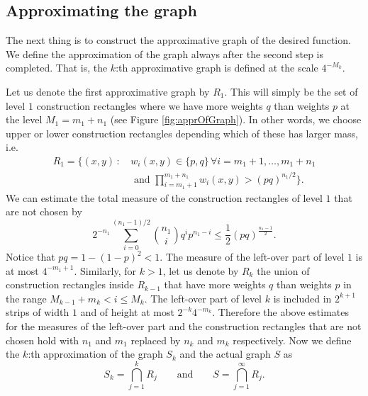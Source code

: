 \documentclass[reqno,12pt]{amsart}
\theoremstyle{plain}
\theoremstyle{remark}
\begin{document}
\subsection{Approximating the graph}
The next thing is to construct the approximative graph of the desired function. 
We define the approximation of the graph always after the second step is completed. 
That is, the $k$:th approximative graph is defined at the scale $4^{-M_k}$.

Let us denote the first approximative graph by $R_1$.
This will simply be the set of level $1$ construction rectangles where we have more 
weights $q$ than weights $p$ at the level $M_1 = m_1 + n_1$ (see Figure \ref{fig:apprOfGraph}).
In other words, we choose upper or lower construction rectangles depending which of these has larger mass, i.e.
\begin{align*}
  R_1 = \bigg\{ (x,y)\,:\,
    &w_i(x,y) \in \{p, q\} \,\forall i=m_1+1,\dots,m_1+n_1\\
    & \text{ and } \prod_{i = m_1+1}^{m_1+n_1}w_i(x,y) > (pq)^{n_1/2} \bigg\} .
\end{align*}
We can estimate the total measure of the construction rectangles of level $1$ that are not chosen by
\[
 2^{-n_1}\sum_{i=0}^{(n_1-1)/2}\binom{n_1}{i}q^ip^{n_1-i} \le \frac12(pq)^{\frac{n_1-1}{2}}. 
\]
Notice that $pq = 1- (1-p)^2 < 1$. The measure of the left-over part of level $1$ is at most $4^{-m_1+1}$.
Similarly, for $k >1$, let us denote by $R_k$ the union of construction rectangles inside $R_{k-1}$ that have more weights $q$ than weights $p$
in the range $M_{k-1} + m_k < i \leq M_k$. 
The left-over part of level $k$ is included in $2^{k+1}$ strips of width $1$ and of height at most $2^{-k} 4^{-m_k}$.
Therefore the above estimates for the measures of the left-over part
and the construction rectangles
that are not chosen
hold with $n_1$ and $m_1$ replaced by $n_k$ and $m_k$ respectively.
Now we define the $k$:th approximation
of the graph $S_k$ and the actual graph $S$ as
\[
S_k = \bigcap_{j=1}^k R_j \qquad \text{and} \qquad S = \bigcap_{j=1}^\infty R_j.
\]
\end{document}

